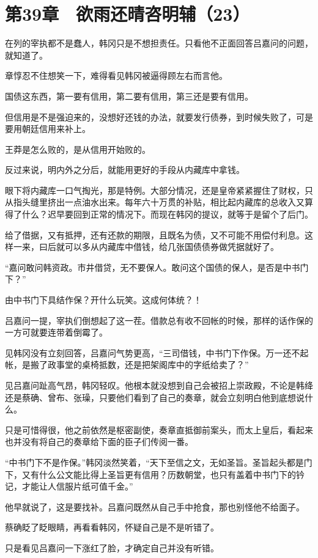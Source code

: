 \section{第39章　欲雨还晴咨明辅（23）}

在列的宰执都不是蠢人，韩冈只是不想担责任。只看他不正面回答吕嘉问的问题，就知道了。

章惇忍不住想笑一下，难得看见韩冈被逼得顾左右而言他。

国债这东西，第一要有信用，第二要有信用，第三还是要有信用。

但信用是不是强迫来的，没想好还钱的办法，就要发行债券，到时候失败了，可是要用朝廷信用来补上。

王莽是怎么败的，是从信用开始败的。

反过来说，明内外之分后，就能用更好的手段从内藏库中拿钱。

眼下将内藏库一口气掏光，那是特例。大部分情况，还是皇帝紧紧握住了财权，只从指头缝里挤出一点油水出来。每年六十万贯的补贴，相比起内藏库的总收入又算得了什么？迟早要回到正常的情况下。而现在韩冈的提议，就等于是留个了后门。

给了借据，又有抵押，还有还款的期限，且既名为债，又不可能不用偿付利息。这样一来，曰后就可以多从内藏库中借钱，给几张国债债券做凭据就好了。

“嘉问敢问韩资政。市井借贷，无不要保人。敢问这个国债的保人，是否是中书门下？”

由中书门下具结作保？开什么玩笑。这成何体统？！

吕嘉问一提，宰执们倒想起了这一茬。借款总有收不回帐的时候，那样的话作保的一方可就要连带着倒霉了。

见韩冈没有立刻回答，吕嘉问气势更高，“三司借钱，中书门下作保。万一还不起帐，是搬了政事堂的桌椅抵数，还是把架阁库中的字纸给卖了？”

见吕嘉问趾高气昂，韩冈轻叹。他根本就没想到自己会被招上崇政殿，不论是韩绛还是蔡确、曾布、张璪，只要他们看到了自己的奏章，就会立刻明白他到底想说什么。

只是可惜得很，他之前依然是枢密副使，奏章直抵御前案头，而太上皇后，看起来也并没有将自己的奏章给下面的臣子们传阅一番。

“中书门下不是作保。”韩冈淡然笑着，“天下至信之文，无如圣旨。圣旨起头都是门下，又有什么公文能比得上圣旨更有信用？历数朝堂，也只有盖着中书门下的钤记，才能让人信服片纸可值千金。”

他早就说了，这是要找补。吕嘉问既然从自己手中抢食，那也别怪他不给面子。

蔡确眨了眨眼睛，再看看韩冈，怀疑自己是不是听错了。

只是看见吕嘉问一下涨红了脸，才确定自己并没有听错。

